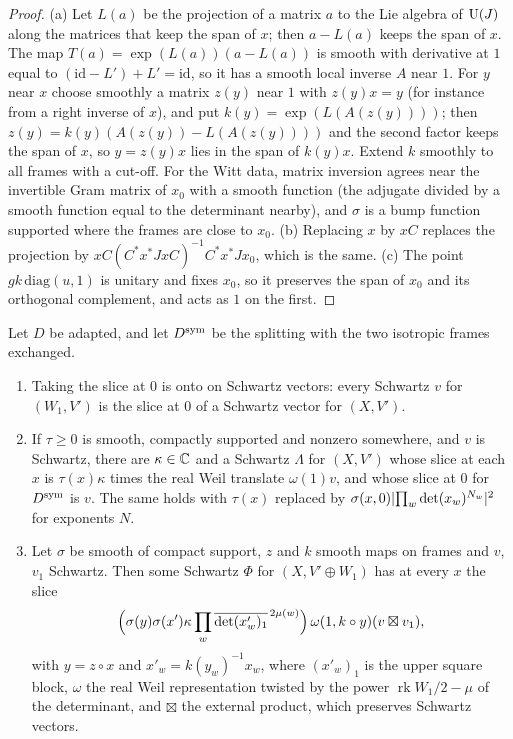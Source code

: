 \begin{proof}
(a) Let $L(a)$ be the projection of a matrix $a$ to the Lie algebra of $\operatorname{U}(J)$ along the matrices that keep the span of $x$; then $a-L(a)$ keeps the span of $x$. The map $T(a)=\exp(L(a))(a-L(a))$ is smooth with
derivative at $1$ equal to $(\mathrm{id}-L')+L'=\mathrm{id}$, so it has a smooth local inverse $A$ near $1$. For $y$ near $x$ choose smoothly a matrix $z(y)$ near $1$ with $z(y)x=y$ (for instance from a
right inverse of $x$), and put $k(y)=\exp(L(A(z(y))))$; then $z(y)=k(y)(A(z(y))-L(A(z(y))))$ and the second factor keeps the span of $x$, so $y=z(y)x$ lies in the span of $k(y)x$. Extend $k$ smoothly to all
frames with a cut-off. For the Witt data, matrix inversion agrees near the invertible Gram matrix of $x_0$ with a smooth function (the adjugate divided by a smooth function equal to the determinant nearby),
and $\sigma$ is a bump function supported where the frames are close to $x_0$. (b) Replacing $x$ by $xC$ replaces the projection by $xC(C^*x^*JxC)^{-1}C^*x^*Jx_0$, which is the same. (c) The point $gk\,\mathrm{diag}(u,1)$
is unitary and fixes $x_0$, so it preserves the span of $x_0$ and its orthogonal complement, and acts as $1$ on the first.
\end{proof}

\begin{lemma}\label{lem:prescribed-slices}
Let $D$ be adapted, and let $D^{\rm sym}$ be the splitting with the two isotropic frames exchanged.
\begin{enumerate}[label=\textup{(\alph*)}]
\item Taking the slice at $0$ is onto on Schwartz vectors: every Schwartz $v$ for $(W_1,V')$ is the slice at $0$ of a Schwartz vector for $(X,V')$.
\item If $\tau\ge0$ is smooth, compactly supported and nonzero somewhere, and $v$ is Schwartz, there are $\kappa\in\mathbb{C}$ and a Schwartz $\Lambda$ for $(X,V')$ whose slice at each $x$ is $\tau(x)\kappa$ times the
real Weil translate $\omega(1)v$, and whose slice at $0$ for $D^{\rm sym}$ is $v$. The same holds with $\tau(x)$ replaced by $\sigma(x,0)\lvert \prod_w\det(x_w)^{N_w}\rvert^2$ for exponents $N$.
\item Let $\sigma$ be smooth of compact support, $z$ and $k$ smooth maps on frames and $v$, $v_1$ Schwartz. Then some Schwartz $\Phi$ for $(X,V'\oplus W_1)$ has at every $x$ the slice
\[
  \Bigl(\sigma(y)\sigma(x')\kappa\prod_w\overline{\det(x'_w)_1}^{\,2\mu(w)}\Bigr)\,\omega(1,k\circ y)(v\boxtimes v_1),
\]
with $y=z\circ x$ and $x'_w=k(y_w)^{-1}x_w$,
where $(x'_w)_1$ is the upper square block, $\omega$ the real Weil representation twisted by the power $\operatorname{rk}W_1/2-\mu$ of the determinant, and $\boxtimes$ the external product, which preserves Schwartz
vectors.
\end{enumerate}
\end{lemma}

